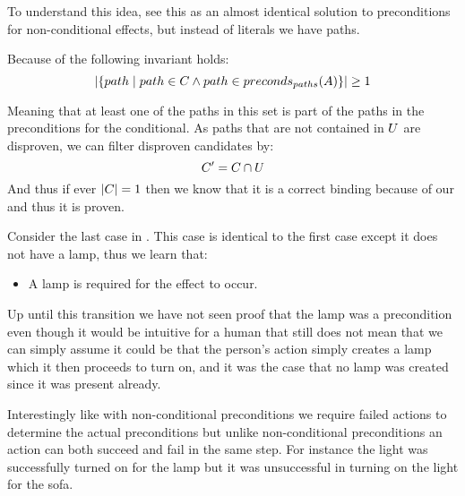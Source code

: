 \documentclass[\master/Master.tex]{subfiles}
\begin{document}
To understand this idea, see this as an almost identical solution to preconditions for non-conditional effects, but instead of literals we have paths.

Because of  the following invariant holds:
\begin{equation} \label{eq:binding_invariant}
\left| \{path  \mid  path \in C \land path \in preconds_{paths}(A)\} \right|  \ge 1
\end{equation}


Meaning that at least one of the paths in this set is part of the paths in the preconditions for the conditional. As paths that are not contained in $U$ are disproven, we can filter disproven candidates by:
\begin{equation}
    C' = C \cap U
\end{equation}
And thus if ever $|C| = 1$ then we know that it is a correct binding because of our  and thus it is proven.

\begin{example}\label{ex:ca:light-on-3}
    Consider the last case in . This case is identical to the first case except it does not have a lamp, thus we learn that:
    \begin{itemize}
        \item A lamp is required for the effect to occur.
    \end{itemize}
    Up until this transition we have not seen proof that the lamp was a precondition even though it would be intuitive for a human that still does not mean that we can simply assume it could be that the person's action simply creates a lamp which it then proceeds to turn on, and it was the case that no lamp was created since it was present already.
    
    Interestingly like with non-conditional preconditions we require failed actions to determine the actual preconditions but unlike non-conditional preconditions an action can both succeed and fail in the same step. For instance the light was successfully turned on for the lamp but it was unsuccessful in turning on the light for the sofa.

\end{example}
\end{document}
